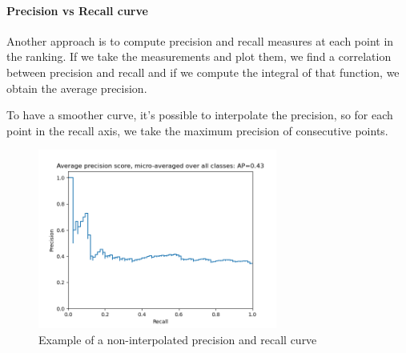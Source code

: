 \paragraph{Precision vs Recall curve}
Another approach is to compute precision and recall measures at each point in the ranking.
If we take the measurements and plot them, we find a correlation between precision 
and recall and if we compute the integral of that function, we obtain the average precision.

To have a smoother curve, it's possible to interpolate the precision, so for each 
point in the recall axis, we take the maximum precision of consecutive points.

\begin{figure}[h]
    \centering
    \includegraphics[width=0.7\textwidth]{images/precision-recall.png}
    \caption{Example of a non-interpolated precision and recall curve}
\end{figure}